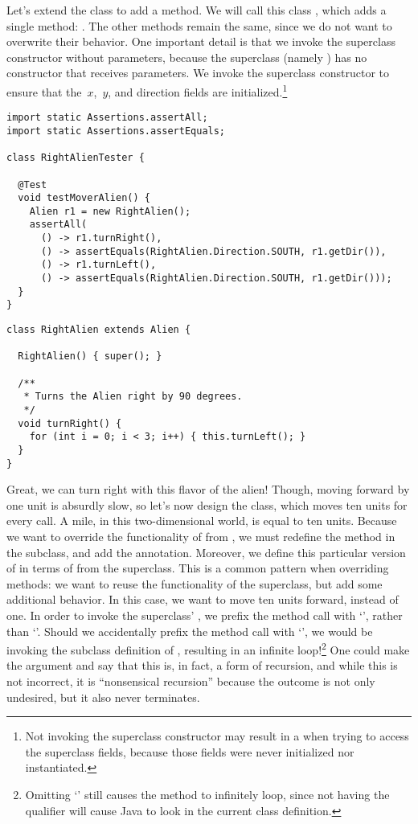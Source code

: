 Let's extend the  class to add a  method. 
We will call this class , which adds a single method: . 
The other methods remain the same, since we do not want to overwrite their behavior. 
One important detail is that we invoke the superclass constructor without parameters, because the superclass (namely ) has no constructor that receives parameters. 
We invoke the superclass constructor to ensure that the~$x$,~$y$, and direction fields are initialized.\footnote{Not invoking the superclass constructor may result in a  when trying to access the superclass fields, because those fields were never initialized nor instantiated.}

\begin{lstlisting}[language=MyJava]
import static Assertions.assertAll;
import static Assertions.assertEquals;

class RightAlienTester {

  @Test
  void testMoverAlien() {
    Alien r1 = new RightAlien();
    assertAll(
      () -> r1.turnRight(),
      () -> assertEquals(RightAlien.Direction.SOUTH, r1.getDir()),
      () -> r1.turnLeft(),
      () -> assertEquals(RightAlien.Direction.SOUTH, r1.getDir()));
  }
}
\end{lstlisting}

\begin{lstlisting}[language=MyJava]
class RightAlien extends Alien {

  RightAlien() { super(); }

  /**
   * Turns the Alien right by 90 degrees.
   */
  void turnRight() {
    for (int i = 0; i < 3; i++) { this.turnLeft(); }
  }
}
\end{lstlisting}

Great, we can turn right with this flavor of the alien! 
Though, moving forward by one unit is absurdly slow, so let's now design the  class, which moves ten units for every  call. 
A mile, in this two-dimensional world, is equal to ten units. 
Because we want to override the functionality of  from , we must redefine the method in the subclass, and add the  annotation. 
Moreover, we define this particular version of  in terms of  from the superclass. 
This is a common pattern when overriding methods: we want to reuse the functionality of the superclass, but add some additional behavior. 
In this case, we want to move ten units forward, instead of one. 
In order to invoke the superclass' , we prefix the method call with `', rather than `'. 
Should we accidentally prefix the method call with `', we would be invoking the subclass definition of , resulting in an infinite loop!\footnote{Omitting `' still causes the method to infinitely loop, since not having the qualifier will cause Java to look in the current class definition.} 
One could make the argument and say that this is, in fact, a form of recursion, and while this is not incorrect, it is ``nonsensical recursion'' because the outcome is not only undesired, but it also never terminates.

